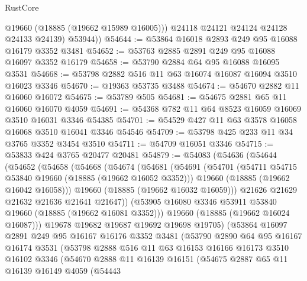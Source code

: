\begin{lexlean}{RustCore}
\begin{coremodule}
            @19660
            (@18885 (@19662 @15989 @16005)))
          @24118
          @24121
          @24124
          @24128
          @24133
          @24139)
        @53944))
@54644 := @53864 @16018 @2893 @249 @95 @16088 @16179 @3352 @3481
@54652 := @53763 @2885 @2891 @249 @95 @16088 @16097 @3352 @16179
@54658 := @53790 @2884 @64 @95 @16088 @16095 @3531
@54668 := @53798 @2882 @516 @11 @63 @16074 @16087 @16094 @3510 @16023 @3346
@54670 := @19363 @53735 @3488
@54674 := @54670 @2882 @11 @16060 @16072
@54675 := @53789 @505
@54681 := @54675 @2881 @65 @11 @16060 @16070 @4059
@54691 := @54368 @782 @11 @64 @8523 @16059 @16069 @3510 @16031 @3346 @54385
@54701 := @54529 @427 @11 @63 @3578 @16058 @16068 @3510 @16041 @3346 @54546
@54709 := @53798 @425 @233 @11 @34 @3765 @3352 @3454 @3510
@54711 := @54709 @16051 @3346
@54715 := @53833 @424 @3765 @20477 @20481
@54879 := @54083
    (@54636
      (@54644
        (@54652
          (@54658
            (@54668
              (@54674
                (@54681
                  (@54691
                    (@54701
                      (@54711 @54715 @53840 @19660 (@18885 (@19662 @16052 @3352)))
                      @19660
                      (@18885 (@19662 @16042 @16058)))
                    @19660
                    (@18885 (@19662 @16032 @16059)))
                  @21626
                  @21629
                  @21632
                  @21636
                  @21641
                  @21647))
              (@53905 @16080 @3346 @53911 @53840 @19660 (@18885 (@19662 @16081 @3352)))
              @19660
              (@18885 (@19662 @16024 @16087)))
            @19678
            @19682
            @19687
            @19692
            @19698
            @19705)
          (@53864
            @16097
            @2891
            @249
            @95
            @16167
            @16176
            @3352
            @3481
            (@53790
              @2890
              @64
              @95
              @16167
              @16174
              @3531
              (@53798
                @2888
                @516
                @11
                @63
                @16153
                @16166
                @16173
                @3510
                @16102
                @3346
                (@54670
                  @2888
                  @11
                  @16139
                  @16151
                  (@54675
                    @2887
                    @65
                    @11
                    @16139
                    @16149
                    @4059
                    (@54443

\end{coremodule}
\end{lexlean}
